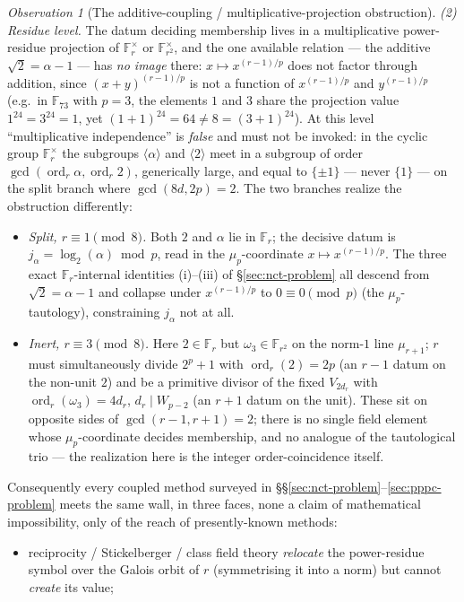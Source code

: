 \documentclass[11pt]{amsart}
\theoremstyle{plain}
\theoremstyle{definition}
\theoremstyle{remark}
\newtheorem{observation}[theorem]{Observation}
\numberwithin{equation}{section}
\newcommand{\ord}{\operatorname{ord}}
\newcommand{\F}{\mathbb{F}}
\begin{document}
\begin{observation}[The additive-coupling / multiplicative-projection obstruction]
\emph{(2) Residue level.} The datum deciding membership lives in a multiplicative power-residue projection of $\F_r^\times$ or $\F_{r^2}^\times$, and the one available relation --- the additive $\sqrt 2 = \alpha - 1$ --- has \emph{no image} there: $x \mapsto x^{(r-1)/p}$ does not factor through addition, since $(x + y)^{(r-1)/p}$ is not a function of $x^{(r-1)/p}$ and $y^{(r-1)/p}$ (e.g.\ in $\F_{73}$ with $p = 3$, the elements $1$ and $3$ share the projection value $1^{24} = 3^{24} = 1$, yet $(1+1)^{24} = 64 \neq 8 = (3+1)^{24}$). At this level ``multiplicative independence'' is \emph{false} and must not be invoked: in the cyclic group $\F_r^\times$ the subgroups $\langle \alpha \rangle$ and $\langle 2 \rangle$ meet in a subgroup of order $\gcd(\ord_r \alpha, \ord_r 2)$, generically large, and equal to $\{\pm 1\}$ --- never $\{1\}$ --- on the split branch where $\gcd(8 d, 2 p) = 2$. The two branches realize the obstruction differently:
\begin{itemize}
\item \emph{Split, $r \equiv 1 \pmod 8$.} Both $2$ and $\alpha$ lie in $\F_r$; the decisive datum is $j_\alpha = \log_2(\alpha) \bmod p$, read in the $\mu_p$-coordinate $x \mapsto x^{(r-1)/p}$. The three exact $\F_r$-internal identities (i)--(iii) of \S\ref{sec:nct-problem} all descend from $\sqrt 2 = \alpha - 1$ and collapse under $x^{(r-1)/p}$ to $0 \equiv 0 \pmod p$ (the $\mu_p$-tautology), constraining $j_\alpha$ not at all.
\item \emph{Inert, $r \equiv 3 \pmod 8$.} Here $2 \in \F_r$ but $\omega_3 \in \F_{r^2}$ on the norm-$1$ line $\mu_{r+1}$; $r$ must simultaneously divide $2^p + 1$ with $\ord_r(2) = 2 p$ (an $r-1$ datum on the non-unit $2$) and be a primitive divisor of the fixed $V_{2 d_r}$ with $\ord_r(\omega_3) = 4 d_r$, $d_r \mid W_{p-2}$ (an $r+1$ datum on the unit). These sit on opposite sides of $\gcd(r-1, r+1) = 2$; there is no single field element whose $\mu_p$-coordinate decides membership, and no analogue of the tautological trio --- the realization here is the integer order-coincidence itself.
\end{itemize}
Consequently every coupled method surveyed in \S\S\ref{sec:nct-problem}--\ref{sec:pppc-problem} meets the same wall, in three faces, none a claim of mathematical impossibility, only of the reach of presently-known methods:
\begin{itemize}
\item[(R)] reciprocity / Stickelberger / class field theory \emph{relocate} the power-residue symbol over the Galois orbit of $r$ (symmetrising it into a norm) but cannot \emph{create} its value;

\end{itemize}
\end{observation}
\end{document}

